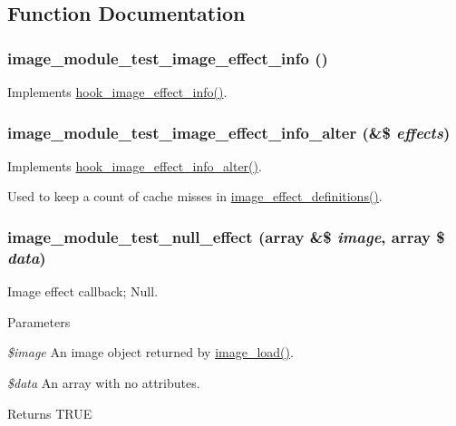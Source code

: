 \subsection{Function Documentation}
\hypertarget{image__module__test_8module_a666de4b9a3cc56458e14647046e7604d}{
\subsubsection[{image\_\-module\_\-test\_\-image\_\-effect\_\-info}]{\setlength{\rightskip}{0pt plus 5cm}image\_\-module\_\-test\_\-image\_\-effect\_\-info ()}}
\label{image__module__test_8module_a666de4b9a3cc56458e14647046e7604d}
Implements \hyperlink{group__hooks_ga9681816aeb01a316e98457b40a01f8ed}{hook\_\-image\_\-effect\_\-info()}. \hypertarget{image__module__test_8module_ae67c8b32aaeaf1c75c0985a83bef3165}{
\subsubsection[{image\_\-module\_\-test\_\-image\_\-effect\_\-info\_\-alter}]{\setlength{\rightskip}{0pt plus 5cm}image\_\-module\_\-test\_\-image\_\-effect\_\-info\_\-alter (\&\$ {\em effects})}}
\label{image__module__test_8module_ae67c8b32aaeaf1c75c0985a83bef3165}
Implements \hyperlink{group__hooks_gaf48ed66489194afdf3e5bce6b3e28768}{hook\_\-image\_\-effect\_\-info\_\-alter()}.

Used to keep a count of cache misses in \hyperlink{image_8module_a8b4b01544349854c77bad8727d52f7d1}{image\_\-effect\_\-definitions()}. \hypertarget{image__module__test_8module_a1a0a065dcba8f1dd346104282fb29fea}{
\subsubsection[{image\_\-module\_\-test\_\-null\_\-effect}]{\setlength{\rightskip}{0pt plus 5cm}image\_\-module\_\-test\_\-null\_\-effect (array \&\$ {\em image}, \/  array \$ {\em data})}}
\label{image__module__test_8module_a1a0a065dcba8f1dd346104282fb29fea}
Image effect callback; Null.


\begin{DoxyParams}{Parameters}
\item[{\em \$image}]An image object returned by \hyperlink{group__image_ga96098e5b039dc3906a656fa889a04776}{image\_\-load()}. \item[{\em \$data}]An array with no attributes.\end{DoxyParams}
\begin{DoxyReturn}{Returns}
TRUE 
\end{DoxyReturn}
